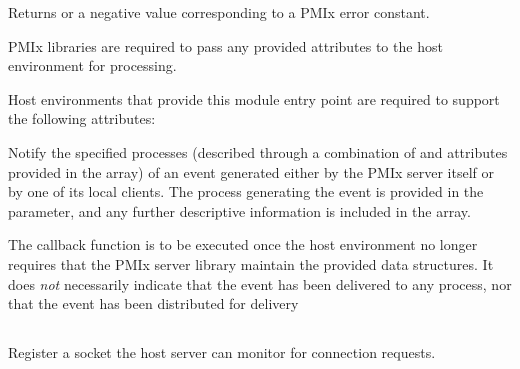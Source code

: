 \begin{arglist}
\end{arglist}

Returns  or a negative value corresponding to a \ac{PMIx} error constant.

\reqattrstart
\ac{PMIx} libraries are required to pass any provided attributes to the host environment for processing.

Host environments that provide this module entry point are required to support the following attributes:


\reqattrend

\descr

Notify the specified processes (described through a combination of  and attributes provided in the  array) of an event generated either by the \ac{PMIx} server itself or by one of its local clients.
The process generating the event is provided in the  parameter, and any further descriptive information is
included in the  array.

\advicermstart
The callback function is to be executed once the host environment no longer requires that the \ac{PMIx} server library maintain the provided data structures. It does \emph{not} necessarily indicate that the event has been delivered to any process, nor that the event has been distributed for delivery
\advicermend


\subsection{}

\summary

Register a socket the host server can monitor for connection requests.

